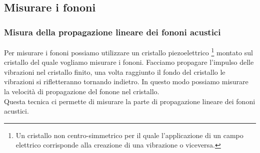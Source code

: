\subsection{Misurare i fononi}
\label{subsec:Misurare i fononi}
\subsubsection{Misura della propagazione lineare dei fononi acustici}
\label{subsubsec:Misura della propagazione lineare dei fononi acustici}
Per misurare i fononi possiamo utilizzare un cristallo piezoelettrico \footnote{Un cristallo non centro-simmetrico per il quale l'applicazione di un campo elettrico corrisponde alla creazione di una vibrazione o viceversa.} montato sul cristallo del quale vogliamo misurare i fononi. Facciamo propagare l'impulso delle vibrazioni nel cristallo finito, una volta raggiunto il fondo del cristallo le vibrazioni si rifletteranno tornando indietro. In questo modo possiamo misurare la velocità di propagazione del fonone nel  cristallo. \\
Questa tecnica ci permette di misurare la parte di propagazione lineare dei fononi acustici. 
